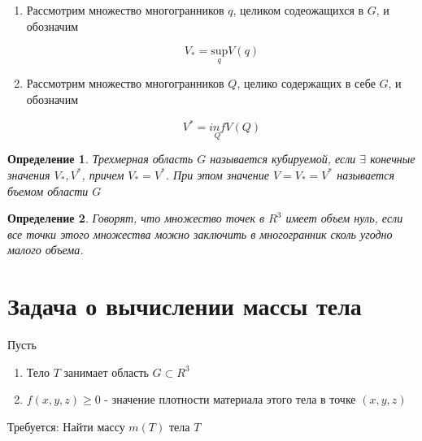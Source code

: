 \documentclass[a4paper, 14pt]{report}
\newtheorem{defenition}{Определение}[chapter]
\begin{document}
    \begin{enumerate}
        \item Рассмотрим множество многогранников $q$, целиком содеожащихся в $G$, и обозначим 

            $$
            V_* = \underset{q}{\text{sup}} V(q)
            $$

        \item Рассмотрим множество многогранников $Q$, целико содержащих в себе $G$, и обозначим 

            $$
            V^* = \underset{Q}{inf} V(Q)
            $$
    \end{enumerate}

    \begin{defenition}
        Трехмерная область $G$ называется кубируемой, если $\exists$ конечные значения $V_*, V^*$, причем $V_* = V^*$. При этом значение $V = V_* = V^*$ называется бъемом области $G$
    \end{defenition}

    \begin{defenition}
        Говорят, что множество точек в $R^3$ имеет объем нуль, если все точки этого множества можно заключить в многогранник сколь угодно малого объема.
    \end{defenition}

    \section{Задача о вычислении массы тела}

    Пусть 

    \begin{enumerate}
        \item Тело $T$ занимает область $G \subset R^3$
        \item $f(x,y,z) \geq 0$ - значение плотности материала этого тела в точке $(x,y,z)$
    \end{enumerate}

    Требуется: Найти массу $m(T)$ тела $T$
\end{document}
